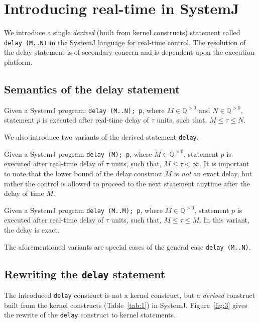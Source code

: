 \section{Introducing real-time in SystemJ}
\label{sec:intr-real-time}

We introduce a single \textit{derived} (built from kernel constructs)
statement called \mbox{\texttt{delay (M..N)}} in the SystemJ language
for real-time control. The resolution of the delay statement is of
secondary concern and is dependent upon the execution platform. 


\subsection{Semantics of the delay statement}
\label{sec:semant-delay-stat}

Given a SystemJ program: \texttt{delay (M..N); p}, where $M \in
\mathbb{Q}^{>0}$ and $N \in \mathbb{Q}^{>0}$, statement $p$ is executed
after real-time delay of $\tau$ units, such that, $M \leq \tau \leq N$.

We also introduce two variants of the derived statement \texttt{delay}.
\begin{enumerate*}
\item Given a SystemJ program \texttt{delay (M); p}, where $M \in
  \mathbb{Q}^{>0}$, statement $p$ is executed after real-time delay of
  $\tau$ units, such that, $M \leq \tau < \infty$. It is important to
  note that the lower bound of the delay construct $M$ is \textit{not}
  an exact delay, but rather the control is allowed to proceed to the
  next statement anytime after the delay of time $M$.
\item Given a SystemJ program \texttt{delay (M..M); p}, where $M \in
  \mathbb{Q}^{>0}$, statement $p$ is executed after real-time delay of
  $\tau$ units, such that, $M \leq \tau \leq M$. In this variant, the
  delay is exact.
\end{enumerate*}

The aforementioned variants are special cases of the general case
\texttt{delay (M..N)}.

\subsection{Rewriting the \texttt{delay} statement}
\label{sec:rewr-delay-stat}

The introduced \texttt{delay} construct is not a kernel construct, but a
\textit{derived} construct built from the kernel constructs
(Table~\ref{tab:1}) in SystemJ. Figure~\ref{fig:3} gives the rewrite of
the \texttt{delay} construct to kernel statements.

